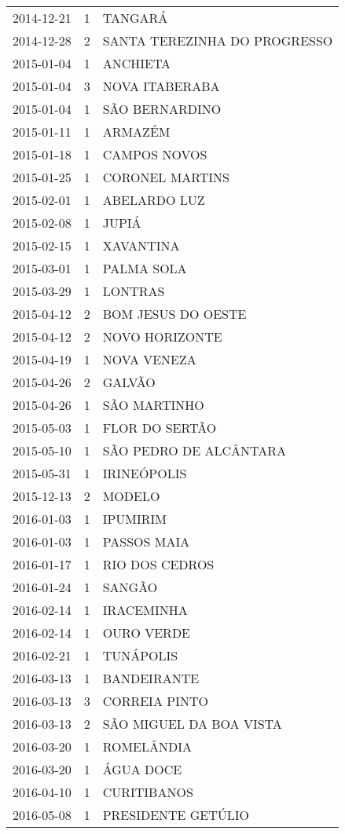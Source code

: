 \documentclass[
	12pt,				%
	openright,			%
	oneside,			%
	a4paper,			%
	english,			%
	french,				%
	spanish,			%
	brazil				%
	dvipsnames, table]{abntex2}
\begin{document}
\begin{longtable}[htbp]{ccl}
2014-12-21 & 1 & TANGARÁ \\
2014-12-28 & 2 & SANTA TEREZINHA DO PROGRESSO \\
2015-01-04 & 1 & ANCHIETA \\
2015-01-04 & 3 & NOVA ITABERABA \\
2015-01-04 & 1 & SÃO BERNARDINO \\
2015-01-11 & 1 & ARMAZÉM \\
2015-01-18 & 1 & CAMPOS NOVOS \\
2015-01-25 & 1 & CORONEL MARTINS \\
2015-02-01 & 1 & ABELARDO LUZ \\
2015-02-08 & 1 & JUPIÁ \\
2015-02-15 & 1 & XAVANTINA \\
2015-03-01 & 1 & PALMA SOLA \\
2015-03-29 & 1 & LONTRAS \\
2015-04-12 & 2 & BOM JESUS DO OESTE \\
2015-04-12 & 2 & NOVO HORIZONTE \\
2015-04-19 & 1 & NOVA VENEZA \\
2015-04-26 & 2 & GALVÃO \\
2015-04-26 & 1 & SÃO MARTINHO \\
2015-05-03 & 1 & FLOR DO SERTÃO \\
2015-05-10 & 1 & SÃO PEDRO DE ALCÂNTARA \\
2015-05-31 & 1 & IRINEÓPOLIS \\
2015-12-13 & 2 & MODELO \\
2016-01-03 & 1 & IPUMIRIM \\
2016-01-03 & 1 & PASSOS MAIA \\
2016-01-17 & 1 & RIO DOS CEDROS \\
2016-01-24 & 1 & SANGÃO \\
2016-02-14 & 1 & IRACEMINHA \\
2016-02-14 & 1 & OURO VERDE \\
2016-02-21 & 1 & TUNÁPOLIS \\
2016-03-13 & 1 & BANDEIRANTE \\
2016-03-13 & 3 & CORREIA PINTO \\
2016-03-13 & 2 & SÃO MIGUEL DA BOA VISTA \\
2016-03-20 & 1 & ROMELÂNDIA \\
2016-03-20 & 1 & ÁGUA DOCE \\
2016-04-10 & 1 & CURITIBANOS \\
2016-05-08 & 1 & PRESIDENTE GETÚLIO \\

\end{longtable}
\end{document}
